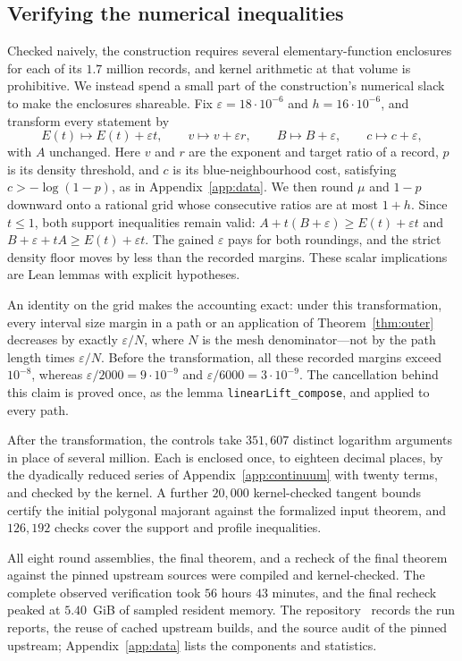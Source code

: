 \documentclass[11pt]{article}
\theoremstyle{definition}
\theoremstyle{remark}
\numberwithin{equation}{section}
\begin{document}
\subsection{Verifying the numerical inequalities}

Checked naively, the construction requires several elementary-function
enclosures for each of its $1.7$ million records, and kernel
arithmetic at that volume is prohibitive. We instead spend a small
part of the construction's numerical slack to make the enclosures
shareable. Fix $\varepsilon=18\cdot10^{-6}$ and $h=16\cdot10^{-6}$,
and transform every statement by
\[
 E(t)\mapsto E(t)+\varepsilon t,\qquad
 v\mapsto v+\varepsilon r,\qquad
 B\mapsto B+\varepsilon,\qquad
 c\mapsto c+\varepsilon,
\]
with $A$ unchanged. Here $v$ and $r$ are the exponent and target
ratio of a record, $p$ is its density threshold, and $c$ is its
blue-neighbourhood cost, satisfying $c> -\log(1-p)$, as in
Appendix~\ref{app:data}.
We then round $\mu$ and $1-p$ downward onto a rational grid whose
consecutive ratios are at most $1+h$. Since $t\le1$, both support
inequalities remain valid:
$A+t(B+\varepsilon)\ge E(t)+\varepsilon t$ and
$B+\varepsilon+tA\ge E(t)+\varepsilon t$. The gained $\varepsilon$
pays for both roundings, and the strict density floor moves by less
than the recorded margins. These scalar implications are Lean lemmas
with explicit hypotheses.

An identity on the grid makes the accounting exact: under this
transformation, every interval size margin in a path or an application of
Theorem~\ref{thm:outer} decreases by exactly
$\varepsilon/N$, where $N$ is the mesh denominator---not by the path
length times $\varepsilon/N$. Before the transformation, all these
recorded margins exceed
$10^{-8}$, whereas $\varepsilon/2000=9\cdot10^{-9}$ and
$\varepsilon/6000=3\cdot10^{-9}$. The cancellation behind this claim
is proved once, as the lemma \texttt{linearLift\_compose}, and applied
to every path.

After the transformation, the controls take $351{,}607$ distinct
logarithm arguments in place of several million. Each is enclosed
once, to eighteen decimal places, by the dyadically reduced series of
Appendix~\ref{app:continuum} with twenty terms, and checked by the
kernel. A further $20{,}000$ kernel-checked tangent bounds certify the
initial polygonal majorant against the formalized input theorem, and
$126{,}192$ checks cover the support and profile inequalities.

All eight round assemblies, the final theorem, and a recheck of the
final theorem against the pinned upstream sources were compiled and
kernel-checked. The complete observed verification took $56$ hours
$43$ minutes, and the final recheck peaked at $5.40$~GiB of sampled
resident memory. The
repository~\cite{Artifact} records the run reports, the reuse of
cached upstream builds, and the source audit of the pinned upstream;
Appendix~\ref{app:data} lists the components and statistics.
\end{document}
